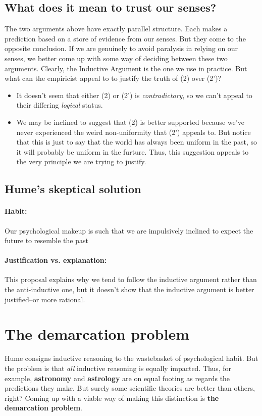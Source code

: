 \documentclass[10pt]{article}
\begin{document}
\subsection{What does it mean to trust our senses?} The two arguments above have exactly parallel structure. Each makes a prediction based on a store of evidence from our senses. But they come to the opposite conclusion. If we are genuinely to avoid paralysis in relying on our senses, we better come up with some way of deciding between these two arguments.  Clearly, the Inductive Argument is the one we use in practice. But what can the empiricist appeal to to justify the truth of (2) over (2')?
\begin{itemize}
 \item It doesn't seem that either (2) or (2') is \textit{contradictory}, so we can't appeal to their differing \textit{logical} status.
 \item We may be inclined to suggest that (2) is better supported because we've never experienced the weird non-uniformity that (2') appeals to.  But notice that this is just to say that the world has always been uniform in the past, so it will probably be uniform in the furture. Thus, this suggestion appeals to the very principle we are trying to justify.
\end{itemize}

\subsection{Hume's skeptical solution}

\paragraph{Habit:} Our psychological makeup is such that we are impulsively inclined to expect the future to resemble the past

\paragraph{Justification vs. explanation:} This proposal explains why we tend to follow the inductive argument rather than the anti-inductive one, but it doesn't show that the inductive argument is better justified--or more rational.


\section{The demarcation problem}
Hume consigns inductive reasoning to the wastebasket of psychological habit.  But the problem is that \textit{all} inductive reasoning is equally impacted.  Thus, for example, \textbf{astronomy} and \textbf{astrology} are on equal footing as regards the predictions they make.  But surely some scientific theories are better than others, right?  Coming up with a viable way of making this distinction is \textbf{the demarcation problem}.
\end{document}
